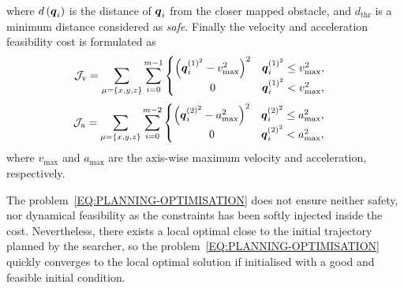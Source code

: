 where $d \left( \boldsymbol{q}_i \right)$ is the distance of $\boldsymbol{q}_i$ from the closer mapped obstacle, and $d_{\text{thr}}$
is a minimum distance considered as \emph{safe}.
Finally the velocity and acceleration feasibility cost is formulated as
\begin{equation*}
	\mathcal{J}_{\text{v}} = \sum_{\mu = \{ x,y,z \}} \sum_{i = 0}^{m - 1}
	\begin{cases}
		\begin{matrix}
			\left( \boldsymbol{q}_i^{{\left( 1 \right)}^2} - v_{\text{max}}^2 \right)^2 & \boldsymbol{q}_i^{{\left( 1 \right)}^2} \le v_{\text{max}}^2, \\
			0 & \boldsymbol{q}_i^{{\left( 1 \right)}^2} < v_{\text{max}}^2,
		\end{matrix}
	\end{cases}
\end{equation*}
\begin{equation*}
	\mathcal{J}_{\text{a}} = \sum_{\mu = \{ x,y,z \}} \sum_{i = 0}^{m - 2}
	\begin{cases}
		\begin{matrix}
			\left( \boldsymbol{q}_i^{{\left( 2 \right)}^2} - a_{\text{max}}^2 \right)^2 & \boldsymbol{q}_i^{{\left( 2 \right)}^2} \le a_{\text{max}}^2, \\
			0 & \boldsymbol{q}_i^{{\left( 2 \right)}^2} < a_{\text{max}}^2,
		\end{matrix}
	\end{cases}
\end{equation*}
where $v_{\text{max}}$ and $a_{\text{max}}$ are the axis-wise maximum velocity and acceleration, respectively.
\begin{remark}
	The problem~\eqref{EQ:PLANNING-OPTIMISATION} does not ensure neither safety, nor dynamical feasibility as the constraints
	has been softly injected inside the cost. Nevertheless, there exists a local optimal close to the initial trajectory planned by
	the searcher, so the problem~\eqref{EQ:PLANNING-OPTIMISATION} quickly converges to the local optimal solution if initialised with a
	good and feasible initial condition.
\end{remark}

